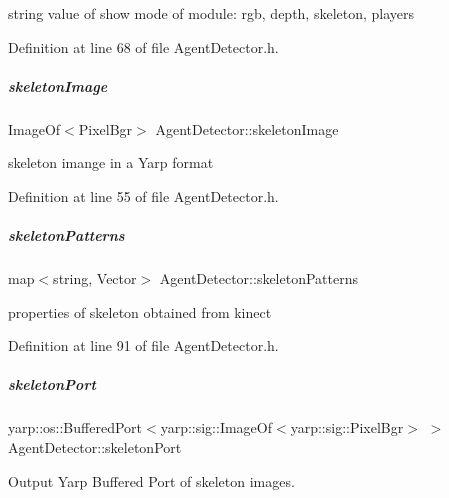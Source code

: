 string value of show mode of module\+: rgb, depth, skeleton, players 



Definition at line 68 of file Agent\+Detector.\+h.

\mbox{\label{group__agentDetector_a9c2e8040860e91c499d63e805cbd6505}} 
\subparagraph{\texorpdfstring{skeleton\+Image}{skeletonImage}}
{\footnotesize\ttfamily Image\+Of$<$Pixel\+Bgr$>$ Agent\+Detector\+::skeleton\+Image\hspace{0.3cm}{\ttfamily [protected]}}



skeleton imange in a Yarp format 



Definition at line 55 of file Agent\+Detector.\+h.

\mbox{\label{group__agentDetector_a325c1d7d68fe58e337e50327b7276160}} 
\subparagraph{\texorpdfstring{skeleton\+Patterns}{skeletonPatterns}}
{\footnotesize\ttfamily map$<$string, Vector$>$ Agent\+Detector\+::skeleton\+Patterns\hspace{0.3cm}{\ttfamily [protected]}}



properties of skeleton obtained from kinect 



Definition at line 91 of file Agent\+Detector.\+h.

\mbox{\label{group__agentDetector_a3f23450351feb8d52896a7b321343a93}} 
\subparagraph{\texorpdfstring{skeleton\+Port}{skeletonPort}}
{\footnotesize\ttfamily yarp\+::os\+::\+Buffered\+Port$<$yarp\+::sig\+::\+Image\+Of$<$yarp\+::sig\+::\+Pixel\+Bgr$>$ $>$ Agent\+Detector\+::skeleton\+Port\hspace{0.3cm}{\ttfamily [protected]}}



Output Yarp Buffered Port of skeleton images. 



